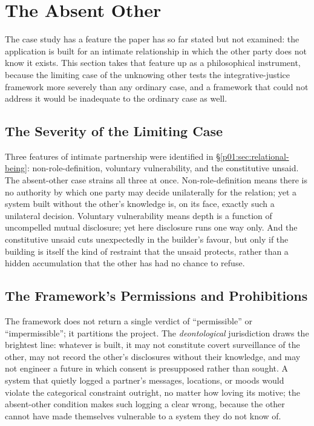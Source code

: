 \section{The Absent Other}\label{p01:sec:absent-other}

The case study has a feature the paper has so far stated but not examined: the application is built for an intimate relationship in which the other party does not know it exists. This section takes that feature up as a philosophical instrument, because the limiting case of the unknowing other tests the integrative-justice framework more severely than any ordinary case, and a framework that could not address it would be inadequate to the ordinary case as well.

\subsection{The Severity of the Limiting Case}

Three features of intimate partnership were identified in §\ref{p01:sec:relational-being}: non-role-definition, voluntary vulnerability, and the constitutive unsaid. The absent-other case strains all three at once. Non-role-definition means there is no authority by which one party may decide unilaterally for the relation; yet a system built without the other's knowledge is, on its face, exactly such a unilateral decision. Voluntary vulnerability means depth is a function of uncompelled mutual disclosure; yet here disclosure runs one way only. And the constitutive unsaid cuts unexpectedly in the builder's favour, but only if the building is itself the kind of restraint that the unsaid protects, rather than a hidden accumulation that the other has had no chance to refuse.

\subsection{The Framework's Permissions and Prohibitions}

The framework does not return a single verdict of ``permissible'' or ``impermissible''; it partitions the project. The \emph{deontological} jurisdiction draws the brightest line: whatever is built, it may not constitute covert surveillance of the other, may not record the other's disclosures without their knowledge, and may not engineer a future in which consent is presupposed rather than sought. A system that quietly logged a partner's messages, locations, or moods would violate the categorical constraint outright, no matter how loving its motive; the absent-other condition makes such logging a clear wrong, because the other cannot have made themselves vulnerable to a system they do not know of.

